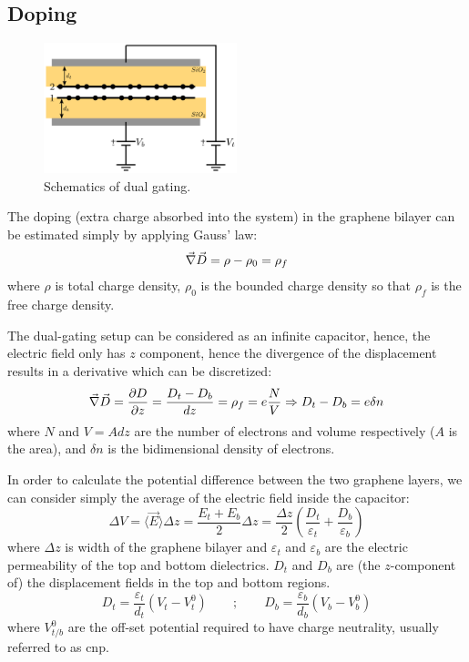 \subsection{Doping}
\begin{figure}[h!]
\centering
\includegraphics[width=0.5\textwidth]{graphene_bilayer/figures/dual_gate.pdf}
\vspace{-5pt}
\caption{Schematics of dual gating.}
\label{dual_gate}
\end{figure}
\FloatBarrier
The doping (extra charge absorbed into the system) in the graphene bilayer can  be estimated simply by applying Gauss' law:
\begin{equation}
   \vec{\nabla}\vec{D} = \rho-\rho_0 = \rho_f
\label{gauss}
\end{equation}
where $\rho$ is total charge density, $\rho_0$ is the bounded charge density so that $\rho_f$ is the free charge density.

The dual-gating setup can be considered as an infinite capacitor, hence, the electric field only has $z$ component, hence the divergence of the displacement results in a derivative which can be discretized:
\begin{equation}
   \vec{\nabla}\vec{D}=\frac{\partial D}{\partial z} =\frac{D_t-D_b}{dz} = \rho_f =
   e\frac{N}{V} \Rightarrow D_t-D_b = e\delta n
\label{doping}
\end{equation}
where $N$ and $V=Adz$ are the number of electrons and volume respectively ($A$ is the area), and $\delta n$ is the bidimensional density of electrons.

In order to calculate the potential difference between the two graphene layers, we can consider simply the average of the electric field inside the capacitor:
\begin{equation}
   \Delta V = \langle\vec{E}\rangle \Delta z = \frac{E_t+E_b}{2} \Delta z=
   \frac{\Delta z}{2} \left(\frac{D_t}{\varepsilon_t} +
                            \frac{D_b}{\varepsilon_b} \right)
\label{potential}
\end{equation}
where $\Delta z$ is width of the graphene bilayer and $\varepsilon_t$ and       $\varepsilon_b$ are the electric permeability of the top and bottom             dielectrics. $D_t$ and $D_b$ are (the $z$-component of) the displacement fields in the top and bottom regions.
\begin{equation}
   D_t = \frac{\varepsilon_t}{d_t}\left(V_{t}-V^0_{t}\right) \qquad;\qquad
   D_b = \frac{\varepsilon_b}{d_b}\left(V_{b}-V^0_{b}\right)
\end{equation}
where $V^0_{t/b}$ are the off-set potential required to have charge neutrality, usually referred to as \ac{cnp}.

